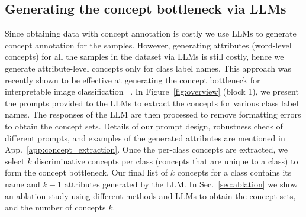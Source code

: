 \subsection{Generating the concept bottleneck via LLMs}
\label{sec:concept_extraction}
Since obtaining data with concept annotation is costly we use LLMs to generate concept annotation for the samples. 
However, generating attributes (word-level concepts) for all the samples in the dataset via LLMs is still costly, hence we generate attribute-level concepts only for class label names. 
This approach was recently shown to be effective at generating the concept bottleneck for interpretable image classification ~\cite{yan2023learning,yang2023language}. 
In Figure~\ref{fig:overview} (block 1), we present the prompts provided to the LLMs to extract the concepts for various class label names. 
The responses of the LLM are then processed to remove formatting errors to obtain the concept sets. 
Details of our prompt design, robustness check of different prompts, and examples of the generated attributes are mentioned in App.~\ref{app:concept_extraction}.
Once the per-class concepts are extracted, we select $k$ discriminative concepts per class (concepts that are unique to a class) to form the concept bottleneck. 
Our final list of $k$ concepts for a class contains its name and $k-1$ attributes generated by the LLM. 
In Sec.~\ref{sec:ablation} we show an ablation study using different methods and LLMs to obtain the concept sets, and the number of concepts $k$.  


